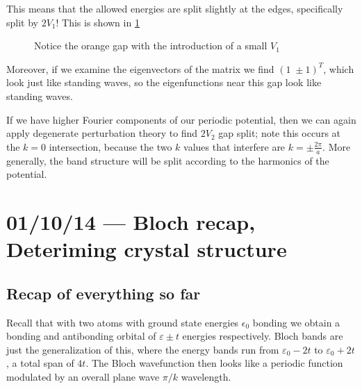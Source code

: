 \documentclass[10pt]{report}
\begin{document}
This means that the allowed energies are split slightly at the edges, specifically split by $2V_1$! This is shown in \ref{17.9.split}
\begin{figure}[!h]
    \centering
    \caption{Notice the orange gap with the introduction of a small $V_1$}
    \label{17.9.split}
\end{figure}

Moreover, if we examine the eigenvectors of the matrix we find $\left( 1\;\pm 1 \right)^T$, which look just like standing waves, so the eigenfunctions near this gap look like standing waves.

If we have higher Fourier components of our periodic potential, then we can again apply degenerate perturbation theory to find $2V_2$ gap split; note this occurs at the $k=0$ intersection, because the two $k$ values that interfere are $k = \pm \frac{2\pi}{a}$. More generally, the band structure will be split according to the harmonics of the potential.

\chapter{01/10/14 --- Bloch recap, Deteriming crystal structure}

\section{Recap of everything so far}

Recall that with two atoms with ground state energies $\epsilon_0$ bonding we obtain a bonding and antibonding orbital of $\varepsilon \pm t$ energies respectively. Bloch bands are just the generalization of this, where the energy bands run from $\varepsilon_0 - 2t$ to $\varepsilon_0 + 2t$, a total span of $4t$. The Bloch wavefunction then looks like a periodic function modulated by an overall plane wave $\pi/k$ wavelength. 
\end{document}
